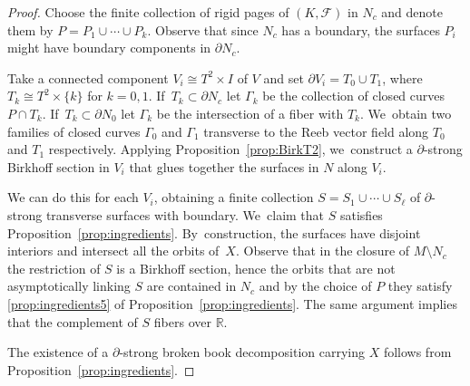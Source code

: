 \documentclass[11pt]{article}
\theoremstyle{definition}
\begin{document}
\begin{proof}
Choose the finite collection of rigid pages of $(K,\mathcal{F})$ in $N_c$ and denote them by $P=P_1\cup \cdots \cup P_k$. Observe that since $N_c$ has a boundary, the surfaces $P_i$ might have boundary components in $\partial N_c$.

Take a connected component $V_i\cong T^2\times I$ of $V$ and set $\partial V_i=T_0\cup T_1$, where $T_k\cong T^2\times \{k\}$ for $k=0,1$. If~$T_k \subset \partial N_c$ let $\Gamma_k$ be the collection of closed curves $P\cap T_k$. If~$T_k\subset \partial N_0$ let $\Gamma_k$ be the intersection of a fiber with $T_k$. We~obtain two families of closed curves $\Gamma_0$ and $\Gamma_1$ transverse to the Reeb vector field along $T_0$ and $T_1$ respectively. Applying Proposition~\ref{prop:BirkT2}, we~construct a $\partial$-strong Birkhoff section in $V_i$ that glues together the surfaces in $N$ along $V_i$.

We can do this for each $V_i$, obtaining a finite collection $S=S_1\cup\cdots \cup S_\ell$ of $\partial$\nobreakdash-strong transverse surfaces with boundary. We~claim that $S$ satisfies Proposition~\ref{prop:ingredients}. By~construction, the surfaces have disjoint interiors and intersect all the orbits of~$X$. Observe that in the closure of $M\setminus N_c$ the restriction of $S$ is a Birkhoff section, hence the orbits that are not asymptotically linking $S$ are contained in $N_c$ and by the choice of $P$ they satisfy \eqref{prop:ingredients5} of Proposition~\ref{prop:ingredients}. The same argument implies that the complement of $S$ fibers over $\mathbb{R}$.

The existence of a $\partial$-strong broken book decomposition carrying $X$ follows from Proposition~\ref{prop:ingredients}.


\end{proof}
\end{document}
